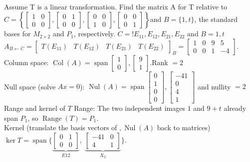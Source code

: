 \documentclass{article}
\begin{document}
\begin{multicols*}{2}
\\Assume T is a linear transformation. Find the matrix A for T relative to $C = \left\{ \begin{bmatrix} 1 & 0 \\ 0 & 0 \end{bmatrix}, \begin{bmatrix} 0 & 1 \\ 0 & 0 \end{bmatrix}, \begin{bmatrix} 0 & 0 \\ 1 & 0 \end{bmatrix}, \begin{bmatrix} 0 & 0 \\ 0 & 1 \end{bmatrix} \right\}$and $B = \{ 1, t \}$, the standard bases for $M_{2 \times 2}$ and $P_1$, respectively.
$C=!{E_{11},E_{12},E_{21},E_{22}}$ and $B={1,t}$ \\ $A_{B\leftarrow C}=\begin{bmatrix}T(E_{11}) & T(E_{12}) & T(E_{21}) & T(E_{22})\end{bmatrix}_{B}=\begin{bmatrix}1 & 0 & 9 & 5\\0 & 0 & 1 & -4\end{bmatrix}.$
\\Column space: $\operatorname{Col}(A)=\operatorname{span}{\begin{bmatrix}1\\0\end{bmatrix},\begin{bmatrix}9\\1\end{bmatrix}}.$Rank $=2$
\\Null space (solve $Ax=0$): $\operatorname{Nul}(A)=\operatorname{span}{\begin{bmatrix}0\\1\\0\\0\end{bmatrix},\begin{bmatrix}-41\\0\\4\\1\end{bmatrix}}$ and nullity $=2$
\\Range and kernel of $T$ Range: The two independent images $1$ and $9+t$ already span $P_1$, so $\displaystyle\operatorname{Range}(T)=P_1.$
\\Kernel (translate the basis vectors of $,\operatorname{Nul}(A)$ back to matrices) $\ker T=\operatorname{span}\!\{\underbrace{\begin{bmatrix}0&1\\0&0\end{bmatrix}}_{E{12}},\;\underbrace{\begin{bmatrix}-41&0\\4&1\end{bmatrix}}_{X_2}\}.$

\end{multicols*}
\end{document}
